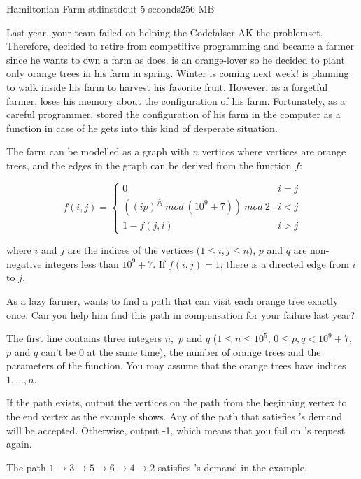 \begin{problem}{Hamiltonian Farm}
{stdin}{stdout}
{5 seconds}{256 MB}{}

Last year, your team failed on helping the Codefalser \Suzukaze  AK the problemset. Therefore, \Suzukaze decided to retire from competitive programming and became a farmer since he wants to own a farm as \pittoresque does. \Suzukaze is an orange-lover so he decided to plant only orange trees in his farm in spring. Winter is coming next week! \Suzukaze is planning to walk inside his farm to harvest his favorite fruit. However, as a forgetful farmer, \Suzukaze loses his memory about the configuration of his farm. Fortunately, as a careful programmer, \Suzukaze stored the configuration of his farm in the computer as a function in case of he gets into this kind of desperate situation.
\par
The farm can be modelled as a graph with $n$ vertices where vertices are orange trees, and the edges in the graph can be derived from the function $f$:

$$f(i,j)=
\begin{cases}
0& \text{$i=j$}\\
((ip)^{jq}\ mod\ (10^{9}+7))\ mod\ 2& \text{$i<j$}\\
1-f(j,i)& \text{$i>j$}
\end{cases}$$

where $i$ and $j$ are the indices of the vertices ($1\leq i,j\leq n$), $p$ and $q$ are non-negative integers less than $10^{9}+7$. If $f(i,j)=1$, there is a directed edge from $i$ to $j$.

\par
As a lazy farmer, \Suzukaze wants to find a path that can visit each orange tree exactly once. Can you help him find this path in compensation for your failure last year?

\InputFile

The first line contains three integers $n$,\ $p$ and $q$ ($1 \leq n \leq 10^{5}$, $0 \leq p,q < 10^{9}+7,$ $p$ and $q$ can't be 0 at the same time), the number of orange trees and the parameters of the function. You may assume that the orange trees have indices $1, ..., n$.

\OutputFile

If the path exists, output the vertices on the path from the beginning vertex to the end vertex as the example shows. Any of the path that satisfies \Suzukaze 's demand will be accepted. Otherwise, output -1, which means that you fail on \Suzukaze 's request again.

\Examples

\begin{example}
%
\end{example}

\Explanation
The path $1\xrightarrow{}3\xrightarrow{}5\xrightarrow{}6\xrightarrow{}4\xrightarrow{}2$ satisfies \Suzukaze's demand in the example.

\end{problem}
